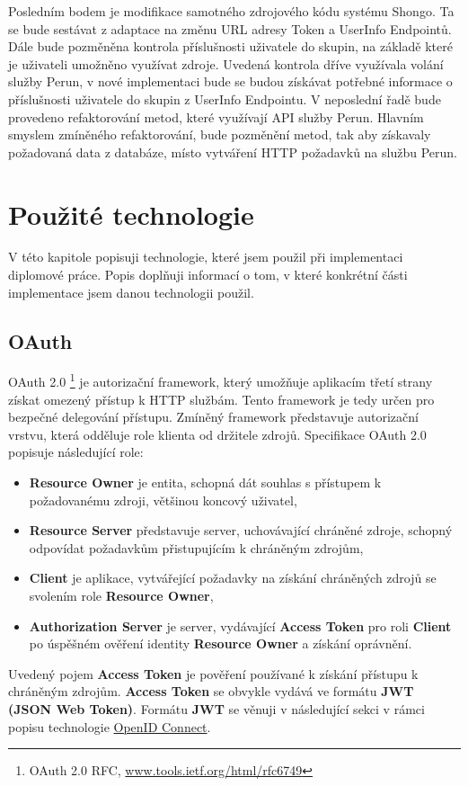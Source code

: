 \documentclass[
  printed, %
  twoside, %
  table,   %
  nolof,     %
  nolot,     %
]{fithesis3}
\begin{document}
Posledním bodem je modifikace samotného zdrojového kódu systému Shongo. Ta se bude sestávat z adaptace na změnu URL adresy Token a UserInfo Endpointů. Dále bude pozměněna kontrola příslušnosti uživatele do skupin, na základě které je uživateli umožněno využívat zdroje. Uvedená kontrola dříve využívala volání služby Perun, v nové implementaci bude se budou získávat potřebné informace o příslušnosti uživatele do skupin z UserInfo Endpointu. V neposlední řadě bude provedeno refaktorování metod, které využívají API služby Perun. Hlavním smyslem zmíněného refaktorování, bude pozměnění metod, tak aby získavaly požadovaná data z databáze, místo vytváření HTTP požadavků na službu Perun.

\chapter{Použité technologie}
V této kapitole popisuji technologie, které jsem použil při implementaci diplomové práce. Popis doplňuji informací o tom, v které konkrétní části implementace jsem danou technologii použil.
\section{OAuth}
\label{sec:oauth}
OAuth 2.0 \footnote{OAuth 2.0 RFC, \url{www.tools.ietf.org/html/rfc6749}} je autorizační framework, který umožňuje aplikacím třetí strany získat omezený přístup k HTTP službám. Tento framework je tedy určen pro bezpečné delegování přístupu. Zmíněný framework představuje autorizační vrstvu, která odděluje role klienta od držitele zdrojů. Specifikace OAuth 2.0 popisuje následující role: 
\begin{itemize}
    \item \textbf{Resource Owner} je entita, schopná dát souhlas s přístupem k požadovanému zdroji, většinou koncový uživatel,
    \item \textbf{Resource Server} představuje server, uchovávající chráněné zdroje, schopný odpovídat požadavkům přistupujícím k chráněným zdrojům,
    \item \textbf{Client} je aplikace, vytvářející požadavky na získání chráněných zdrojů se svolením role \textbf{Resource Owner},
    \item \textbf{Authorization Server} je server, vydávající \textbf{Access Token} pro roli \textbf{Client} po úspěšném ověření identity \textbf{Resource Owner} a získání oprávnění.
\end{itemize}
Uvedený pojem \textbf{Access Token} je pověření používané k získání přístupu k chráněným zdrojům. \textbf{Access Token} se obvykle vydává ve formátu \textbf{JWT (JSON Web Token)}. Formátu \textbf{JWT} se věnuji v následující sekci v rámci popisu technologie \hyperref[sec:oidc]{OpenID Connect}.  \par
\end{document}
